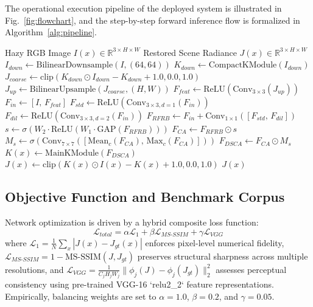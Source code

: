 \documentclass[journal]{IEEEtran}
\begin{document}
The operational execution pipeline of the deployed system is illustrated in Fig.~\ref{fig:flowchart}, and the step-by-step forward inference flow is formalized in Algorithm~\ref{alg:pipeline}.

\begin{algorithm}[!htb]
\caption{DAM-RFRNet Forward Execution Pipeline}
\label{alg:pipeline}
\begin{algorithmic}[1]
\REQUIRE Hazy RGB Image $I(x) \in \mathbb{R}^{3 \times H \times W}$
\ENSURE Restored Scene Radiance $J(x) \in \mathbb{R}^{3 \times H \times W}$
\STATE $I_{down} \gets \text{BilinearDownsample}(I, (64, 64))$
\STATE $K_{down} \gets \text{CompactKModule}(I_{down})$
\STATE $J_{coarse} \gets \text{clip}(K_{down} \odot I_{down} - K_{down} + 1.0, 0.0, 1.0)$
\STATE $J_{up} \gets \text{BilinearUpsample}(J_{coarse}, (H, W))$
\STATE $F_{feat} \gets \text{ReLU}(\text{Conv}_{3\times3}(J_{up}))$
\STATE $F_{in} \gets [I, \, F_{feat}]$ 
\STATE $F_{std} \gets \text{ReLU}(\text{Conv}_{3\times3, d=1}(F_{in}))$
\STATE $F_{dil} \gets \text{ReLU}(\text{Conv}_{3\times3, d=2}(F_{in}))$
\STATE $F_{RFRB} \gets F_{in} + \text{Conv}_{1\times1}([F_{std}, \, F_{dil}])$ 
\STATE $s \gets \sigma(W_2 \cdot \text{ReLU}(W_1 \cdot \text{GAP}(F_{RFRB})))$
\STATE $F_{CA} \gets F_{RFRB} \odot s$ 
\STATE $M_s \gets \sigma(\text{Conv}_{7\times7}([\text{Mean}_c(F_{CA}), \, \text{Max}_c(F_{CA})]))$
\STATE $F_{DSCA} \gets F_{CA} \odot M_s$ 
\STATE $K(x) \gets \text{MainKModule}(F_{DSCA})$
\STATE $J(x) \gets \text{clip}(K(x) \odot I(x) - K(x) + 1.0, 0.0, 1.0)$
\RETURN $J(x)$
\end{algorithmic}
\end{algorithm}

\subsection{Objective Function and Benchmark Corpus}
Network optimization is driven by a hybrid composite loss function:
\begin{equation}
\mathcal{L}_{total} = \alpha \mathcal{L}_1 + \beta \mathcal{L}_{MS\text{-}SSIM} + \gamma \mathcal{L}_{VGG}
\end{equation}
where $\mathcal{L}_1 = \frac{1}{N}\sum_x |J(x) - J_{gt}(x)|$ enforces pixel-level numerical fidelity, $\mathcal{L}_{MS\text{-}SSIM} = 1 - \text{MS-SSIM}(J, J_{gt})$ preserves structural sharpness across multiple resolutions, and $\mathcal{L}_{VGG} = \frac{1}{C_j H_j W_j}\|\phi_j(J) - \phi_j(J_{gt})\|_2^2$ assesses perceptual consistency using pre-trained VGG-16 `relu2\_2` feature representations. Empirically, balancing weights are set to $\alpha = 1.0$, $\beta = 0.2$, and $\gamma = 0.05$.
\end{document}
